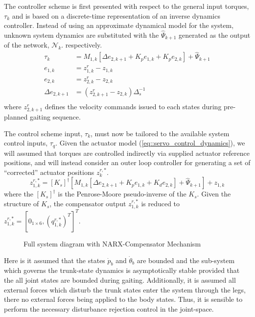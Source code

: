 The controller scheme is first presented with respect to the general input torques, $\tau_{k}$ and is based on a discrete-time 
representation of an inverse dynamics controller. Instead of using an approximate dynamical model for the system, unknown system dynamics are 
substituted with the $\hat{\Psi}_{k+1}$ generated as the output of the network, $\mathscr{N}_{k}$.
respectively.
	\begin{equation}
		\begin{split}
		\tau_{k}   			&=  M_{1,k}[ \Delta e_{2,k+1} + K_{p} e_{1,k} + K_{p} e_{2,k}] + \hat{\Psi}_{k+1} \\
			e_{1,k}			&= {z}_{1,k}^{r} - {z}_{1,k} \\
			e_{2,k}			&= {z}_{2,k}^{r} - {z}_{2,k} \\
			\Delta e_{2,k+1}&= ({z}_{2,k+1}^{r} - {z}_{2,k})\Delta_{s}^{-1}\\
		\end{split}
		\label{eq::digital_controller_base}
	\end{equation}
where ${z}_{2,k+1}^{r}$ defines the velocity commands issued to each states during pre-planned gaiting sequence. 

The control scheme input, $\tau_{k}$, must now be tailored to the available system control inputs, $\tau_{q}$. Given the actuator model 
(\ref{eq::servo_control_dynamics}), we will assumed that torques are controlled indirectly via supplied actuator reference positions, and will instead consider 
an outer loop controller for generating a set of ``corrected'' actuator positions ${z}_{k}^{r,*}$.
	\begin{equation}
	 	{z}_{1,k}^{r,*} 	= [K_{s}]^{\dagger} \left[ M_{1,k}[ \Delta e_{2,k+1} + K_{p} e_{1,k} + K_{d} e_{2,k}] + \hat{\Psi}_{k+1} \right] +  {z}_{1,k}
		\label{eq::correction_equation}
	\end{equation}
where the $[K_{s}]^{\dagger}$ is the Penrose-Moore pseudo-inverse of the $K_{s}$. Given the structure of $K_{s}$, \label{eq::correction_equation} the 
compensator output ${z}_{1,k}^{r,*}$ is reduced to ${z}_{1,k}^{r,*} = [ 0_{1\times6}, ({q}_{1,k}^{r,*})^{T} ]^T$.
	\begin{figure}[b!]
		\centering
		\caption{Full system diagram with NARX-Compensator Mechanism}
		\label{fig::sys_diagram}
	\end{figure}
Here is it assumed that the states $\dot{p}_{b}$ and $\dot{\theta}_{b}$ are bounded and the sub-system which governs the trunk-state 
dynamics is asymptotically stable provided that the all joint states are bounded during gaiting. Additionally, it is assumed all external forces 
which disturb the trunk states enter the system through the legs, \IE there no external forces being applied to the body states. Thus, it is sensible
to perform the necessary disturbance rejection control in the joint-space.


